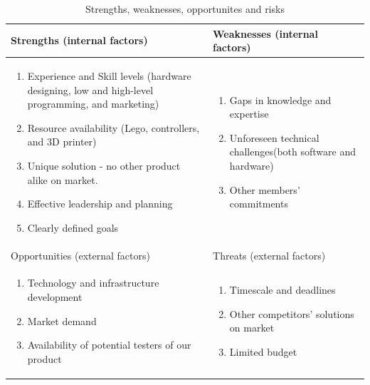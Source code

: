\documentclass{article}
\begin{document}
\begin{table}[h]
\begin{center}
\begin{tabular}{|p{8cm}|p{8cm}|}
\hline
\rowcolor[HTML]{C0C0C0} 
Strengths (internal factors)                                                                                                                                                                                                                                      & Weaknesses (internal factors)                                                                                          \\ \hline
\begin{enumerate}
  \item Experience and Skill levels (hardware designing, low and high-level programming, and marketing)
  \item Resource availability (Lego, controllers, and 3D printer)
  \item Unique solution - no other product alike on market.
  \item Effective leadership and planning
  \item Clearly defined goals
\end{enumerate} & \begin{enumerate}
  \item Gaps in knowledge and expertise
  \item Unforeseen technical challenges(both software and hardware)
  \item Other members' commitments
\end{enumerate} \\ \hline
\rowcolor[HTML]{C0C0C0} 
Opportunities (external factors)                                                                                                                                                                                                                                  & Threats (external factors)                                                                                             \\ \hline
\begin{enumerate}
  \item Technology and infrastructure development
  \item Market demand
  \item Availability of potential testers of our product
\end{enumerate}                                                                                                                                                            & \begin{enumerate}
  \item Timescale and deadlines
  \item Other competitors' solutions on market
  \item Limited budget
\end{enumerate}                                            \\ \hline
\end{tabular}
\end{center}
\caption{Strengths, weaknesses, opportunites and risks}
\label{table:swottable}
\end{table}
\end{document}
